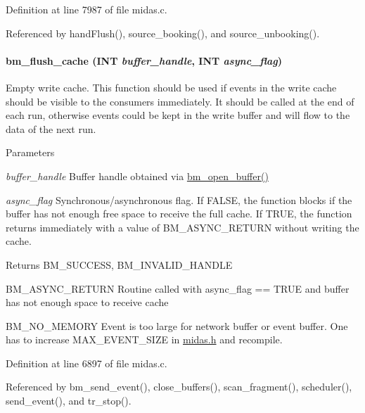 Definition at line 7987 of file midas.c.

Referenced by handFlush(), source\_\-booking(), and source\_\-unbooking().
\paragraph[{bm\_\-flush\_\-cache}]{ bm\_\-flush\_\-cache ({\bf INT} {\em buffer\_\-handle}, \/  {\bf INT} {\em async\_\-flag})}\hfill\label{group__bmfunctionc_ga9b74b8aa633c942682e642acba93c51d}
Empty write cache. This function should be used if events in the write cache should be visible to the consumers immediately. It should be called at the end of each run, otherwise events could be kept in the write buffer and will flow to the data of the next run. 
\begin{DoxyParams}{Parameters}
\item[{\em buffer\_\-handle}]Buffer handle obtained via \hyperlink{group__bmfunctionc_gae9636ff3e34ee94e31cb292bd07a679d}{bm\_\-open\_\-buffer()} \item[{\em async\_\-flag}]Synchronous/asynchronous flag. If FALSE, the function blocks if the buffer has not enough free space to receive the full cache. If TRUE, the function returns immediately with a value of BM\_\-ASYNC\_\-RETURN without writing the cache. \end{DoxyParams}
\begin{DoxyReturn}{Returns}
BM\_\-SUCCESS, BM\_\-INVALID\_\-HANDLE\par
 BM\_\-ASYNC\_\-RETURN Routine called with async\_\-flag == TRUE and buffer has not enough space to receive cache\par
 BM\_\-NO\_\-MEMORY Event is too large for network buffer or event buffer. One has to increase MAX\_\-EVENT\_\-SIZE in \hyperlink{midas_8h}{midas.h} and recompile. 
\end{DoxyReturn}


Definition at line 6897 of file midas.c.

Referenced by bm\_\-send\_\-event(), close\_\-buffers(), scan\_\-fragment(), scheduler(), send\_\-event(), and tr\_\-stop().
